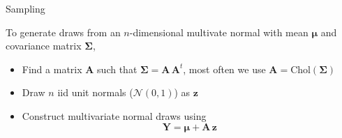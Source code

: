 \documentclass[11pt,ignorenonframetext,]{beamer}
\providecommand{\tightlist}{%
  \setlength{\itemsep}{0pt}\setlength{\parskip}{0pt}}
\begin{document}
\begin{frame}[t]{%
\protect\hypertarget{sampling}{%
Sampling}}

To generate draws from an \(n\)-dimensional multivate normal with mean
\(\symbf{\mu}\) and covariance matrix \(\symbf{\Sigma}\),

\vspace{4mm}

\pause

\begin{itemize}
\tightlist
\item
  Find a matrix \(\symbf{A}\) such that
  \(\symbf{\Sigma} = \symbf{A}\,\symbf{A}^t\), most often we use
  \(\symbf{A} = \text{Chol}(\symbf{\Sigma})\)
\end{itemize}

\pause

\vspace{2mm}

\begin{itemize}
\tightlist
\item
  Draw \(n\) iid unit normals (\(\mathcal{N}(0,1)\)) as \(\symbf{z}\)
\end{itemize}

\pause

\vspace{2mm}

\begin{itemize}
\tightlist
\item
  Construct multivariate normal draws using
  \[ \symbf{Y} = \symbf{\mu} + \symbf{A} \, \symbf{z} \]
\end{itemize}

\end{frame}
\end{document}
